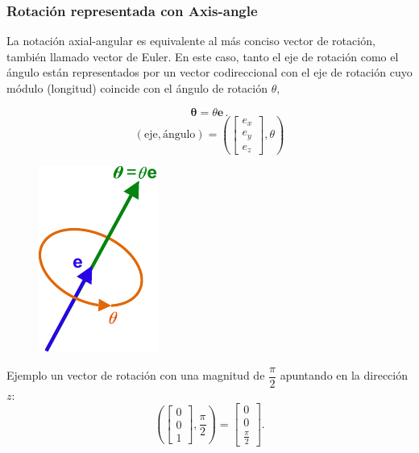 \begin{frame}
    \frametitle{Rotación representada con Axis-angle}
    La notación axial-angular es equivalente al más conciso vector de rotación, también llamado vector de Euler. En este caso, tanto el eje de rotación como el ángulo están representados por un vector codireccional con el eje de rotación cuyo módulo (longitud) coincide con el ángulo de rotación $\theta$,
    \begin{center}
        \begin{minipage}{0.38\linewidth}
            \small
            \begin{equation*}
                {\displaystyle {\boldsymbol {\theta }}=\theta \mathbf {e} \,.}
            \end{equation*}
            \begin{equation*}
                {\displaystyle (\mathrm {eje} ,\mathrm {\text{ángulo}} )=\left({\begin{bmatrix}e_{x}\\e_{y}\\e_{z}\end{bmatrix}},\theta \right)}
            \end{equation*}
        \end{minipage}
        \hspace{1em}
        \begin{minipage}{0.38\linewidth}
            \centering
            \begin{figure}
               \includegraphics[width=0.3\columnwidth]{images/axis_angle_vector.pdf}
            \end{figure}
        \end{minipage}
    \end{center}

    Ejemplo un vector de rotación con una magnitud de $\dfrac{\pi}{2}$ apuntando en la dirección $z$:
    \begin{equation*}
        {\displaystyle {\left({\begin{bmatrix}0\\0\\1\end{bmatrix}},{\frac {\pi }{2}}\right) = \begin{bmatrix}0\\0\\{\frac {\pi }{2}}\end{bmatrix}}.}
    \end{equation*}


\end{frame}
